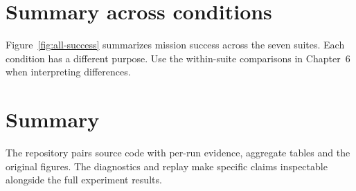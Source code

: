 \clearpage
\section{Summary across conditions}
Figure~\ref{fig:all-success} summarizes mission success across the seven suites. Each condition has a different purpose. Use the within-suite comparisons in Chapter~6 when interpreting differences.
\FloatBarrier

\section{Summary}
The repository pairs source code with per-run evidence, aggregate tables and the original figures. The diagnostics and replay make specific claims inspectable alongside the full experiment results.
